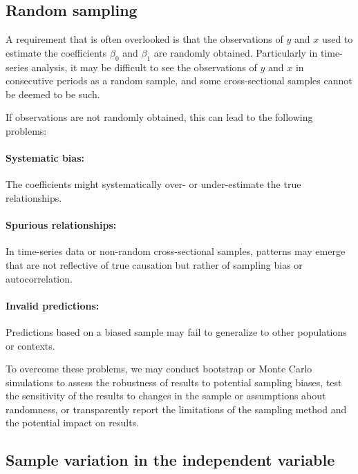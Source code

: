 

\subsection{Random sampling} %
\label{sub:random_sampling}

A requirement that is often overlooked is that the observations of $y$ and $x$ used to estimate the coefficients $\beta_0$ and $\beta_1$ are randomly obtained. Particularly in time-series analysis, it may be difficult to see the observations of $y$ and $x$ in consecutive periods as a random sample, and some cross-sectional samples cannot be deemed to be such.

If observations are not randomly obtained, this can lead to the following problems:

\paragraph{Systematic bias:} The coefficients might systematically over- or under-estimate the true relationships.
\paragraph{Spurious relationships:} In time-series data or non-random cross-sectional samples, patterns may emerge that are not reflective of true causation but rather of sampling bias or autocorrelation.
\paragraph{Invalid predictions:} Predictions based on a biased sample may fail to generalize to other populations or contexts.

\bigskip
To overcome these problems, we may conduct bootstrap or Monte Carlo simulations to assess the robustness of results to potential sampling biases, test the sensitivity of the results to changes in the sample or assumptions about randomness, or transparently report the limitations of the sampling method and the potential impact on results.


\subsection{Sample variation in the independent variable} %
\label{sub:sample_variation_in_the_independent_variable}


